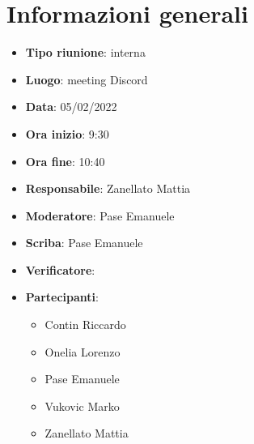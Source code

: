 \section{Informazioni generali}
\begin{itemize}
  \item \textbf{Tipo riunione}: interna
  \item \textbf{Luogo}: meeting Discord
  \item \textbf{Data}: 05/02/2022
  \item \textbf{Ora inizio}: 9:30
  \item \textbf{Ora fine}: 10:40
  \item \textbf{Responsabile}: Zanellato Mattia
  \item \textbf{Moderatore}: Pase Emanuele
  \item \textbf{Scriba}: Pase Emanuele
  \item \textbf{Verificatore}: 
  \item \textbf{Partecipanti}:
  \begin{itemize}
    \item Contin Riccardo
    \item Onelia Lorenzo
    \item Pase Emanuele
    \item Vukovic Marko
    \item Zanellato Mattia
  \end{itemize}
\end{itemize}
